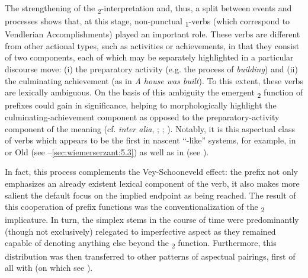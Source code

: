 \documentclass[output=paper]{langsci/langscibook}
\begin{document}
The strengthening of the \textsubscript{2}-interpretation and, thus, a split between  events and  processes shows that, at this stage, non-punctual \textsubscript{1}-verbs (which correspond to Vendlerian Accomplishments) played an important role. These verbs are different from other actional types, such as activities or achievements, in that they consist of two components, each of which may be separately highlighted in a particular discourse move:
 (i) the preparatory activity (e.g. the process of \textit{building}) and
 (ii) the culminating achievement (as in \textit{A house was built}). 
To this extent, these verbs are lexically ambiguous. On the basis of this ambiguity the emergent \textsubscript{2} function of prefixes could gain in significance, helping to morphologically highlight the culminating-achievement component as opposed to the preparatory-activity component of the meaning (cf. \textit{inter alia}, \citealt{Maslov2004[1959]}; \citealt{Breu1992}; \citealt{Bermel1997}). Notably, it is this aspectual class of verbs which appears to be the first in nascent “-like” systems, for example, in  or Old  (see --\ref{sec:wiemerserzant:5.3}) as well as in  (see ).

In fact, this process complements the Vey-Schooneveld effect: the prefix not only emphasizes an already existent lexical component of the verb, it also makes more salient the default focus on the implied endpoint as being reached. The result of this cooperation of prefix functions was the conventionalization of the \textsubscript{2} implicature. In turn, the simplex stems in the course of time were predominantly (though not exclusively) relegated to imperfective aspect as they remained capable of denoting anything else beyond the \textsubscript{2} function. Furthermore, this distribution was then transferred to other patterns of aspectual pairings, first of all with  (on which see ). 
\end{document}
